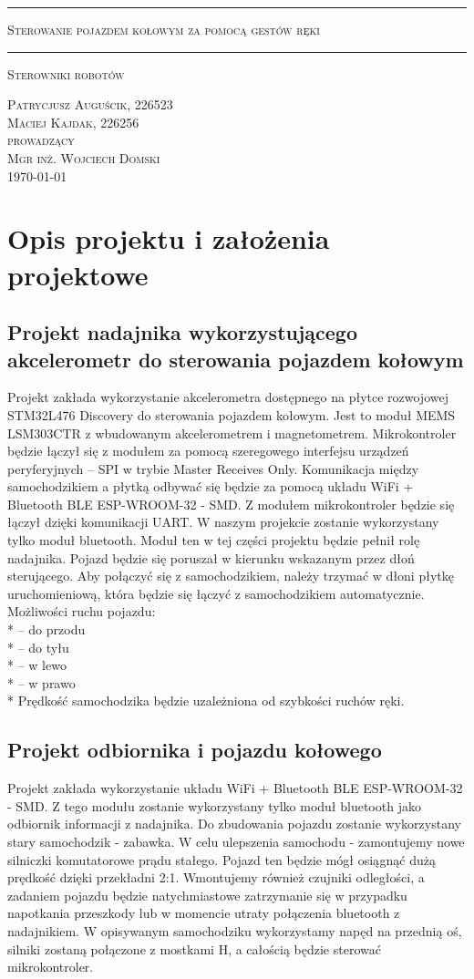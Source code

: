 \documentclass[10pt, a4paper]{report}
\renewcommand{\maketitle}{
	\begin{titlepage}
		
		\begin{center}
			\vspace*{1cm}
			\noindent \rule{\linewidth}{0.4mm}
			\LARGE \textsc{Sterowanie pojazdem kołowym za pomocą gestów ręki}
			\rule{\linewidth}{0.4mm}
			\vspace*{3cm}
			
			\Large
			\textsc{Sterowniki robotów}
			
			\large
			\vspace*{2cm}
			\textsc{Patrycjusz Auguścik, 226523}\\
			\textsc{Maciej Kajdak, 226256}\\
			
			\vspace*{2cm}
			\textsc{prowadzący}\\
			\textsc{Mgr inż. Wojciech Domski}\\
			\vspace*{1.5cm}
			\textsc{\today}
			
		\end{center}
		
	\end{titlepage}
	\newpage}
\begin{document}
	\maketitle
	\tableofcontents
	
	
	\newpage
	\section{Opis projektu i założenia projektowe}
\subsection{Projekt nadajnika wykorzystującego akcelerometr do sterowania pojazdem kołowym}
Projekt zakłada wykorzystanie akcelerometra dostępnego na płytce rozwojowej STM32L476 Discovery do sterowania pojazdem kołowym. Jest to moduł MEMS LSM303CTR z wbudowanym akcelerometrem i magnetometrem. Mikrokontroler będzie łączył się z modułem za pomocą szeregowego  interfejsu urządzeń peryferyjnych -- SPI w trybie Master Receives Only. Komunikacja między samochodzikiem a płytką odbywać się będzie za pomocą układu WiFi + Bluetooth BLE ESP-WROOM-32 - SMD. Z modułem mikrokontroler będzie się łączył dzięki komunikacji UART. W naszym projekcie zostanie wykorzystany tylko moduł bluetooth. Moduł ten w tej części projektu będzie pełnił rolę nadajnika. Pojazd będzie się poruszał w kierunku wskazanym przez dłoń sterującego. Aby połączyć się z samochodzikiem, należy trzymać w dłoni płytkę uruchomieniową, która będzie się łączyć z samochodzikiem automatycznie. 
Możliwości ruchu pojazdu:
\\* -- do przodu
\\* -- do tyłu
\\* -- w lewo
\\* -- w prawo
\\* Prędkość samochodzika będzie uzależniona od szybkości ruchów ręki.


\subsection{Projekt odbiornika i pojazdu kołowego}
Projekt zakłada wykorzystanie układu WiFi + Bluetooth BLE ESP-WROOM-32 - SMD. Z tego modułu zostanie wykorzystany tylko moduł bluetooth jako odbiornik informacji z nadajnika. Do zbudowania pojazdu zostanie wykorzystany stary samochodzik - zabawka. W celu ulepszenia samochodu - zamontujemy nowe silniczki komutatorowe prądu stałego. Pojazd ten będzie mógł osiągnąć dużą prędkość dzięki przekładni 2:1. Wmontujemy również czujniki odległości, a zadaniem pojazdu będzie natychmiastowe zatrzymanie się w przypadku napotkania przeszkody lub w momencie utraty połączenia bluetooth z nadajnikiem.
W opisywanym samochodziku wykorzystamy napęd na przednią oś, silniki zostaną połączone z mostkami H, a całością będzie sterować mikrokontroler.
\end{document}
